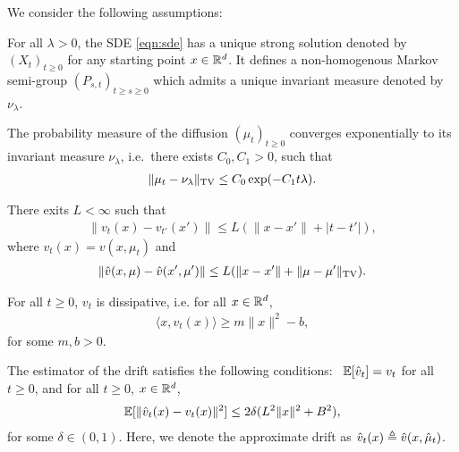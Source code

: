 \newcommand{\minvsp}{0}

We consider the following assumptions: \vspace{\minvsp pt}
\begin{assumption}
\label{asmp:sde_ergo}
For all $\lambda >0$, the SDE  \eqref{eqn:sde} has a unique strong solution denoted by $(X_t)_{t\geq 0}$ for any starting point $x \in \mathbb{R}^d$. It defines a non-homogenous Markov semi-group $(P_{s,t})_{t\geq s\geq 0}$ which admits a unique invariant measure denoted by $\nu_\lambda$. 
\vspace{\minvsp pt}
\end{assumption}
%
\begin{assumption}
\label{asmp:sde_expconv}
The probability measure of the diffusion $(\mu_t)_{t\geq 0}$ converges exponentially to its invariant measure $\nu_\lambda$, i.e.\ there exists $C_0, C_1 >0$, such that
\begin{align}
\|\mu_t - \nu_\lambda \|_{\textnormal{TV}} \leq C_0 \exp(-C_1 t \lambda).
\end{align}
\vspace{\minvsp pt}
\end{assumption}
%
\begin{assumption}
\label{asmp:lipschitz}
There exits $L < \infty$ such that
\begin{align}
\| v_t(x) - v_{t'}(x') \| \leq L ( \|x-x' \| + |t-t'|),
\end{align}
where $v_t(x) = v(x,\mu_t)$ and
\begin{align}
\| \hat{v}(x,\mu) - \hat{v}(x',\mu') \| \leq L ( \|x-x' \| + \|\mu-\mu'\|_{\textnormal{TV}}).
\end{align}
\vspace{\minvsp pt}
\end{assumption}
%
\begin{assumption}
\label{asmp:dissip}
For all $t \geq 0$, $v_t$ is dissipative, i.e. for all $x \in \mathbb{R}^d$,
\begin{align}
\langle x, v_t(x) \rangle \geq m \|x\|^2 -b,
\end{align}
for some $m,b >0$.
\vspace{\minvsp pt}
\end{assumption}
%
\begin{assumption}
\label{asmp:stochgrad}
The estimator of the drift satisfies the following conditions: \ $\mathbb{E}[\hat{v}_t] = v_t$ for all $t \geq 0$, and for all $t\geq 0$, $x \in \mathbb{R}^d$,
\begin{align}
\mathbb{E}[ \|\hat{v}_t(x) - v_t(x) \|^2] \leq 2 \delta(L^2 \|x\|^2 + B^2),
\end{align}
for some $\delta \in (0,1)$. Here, we denote the approximate drift as $\hat{v}_t(x) \triangleq \hat{v}(x,\hat{\mu}_t)$.
\vspace{\minvsp pt}
\end{assumption}
